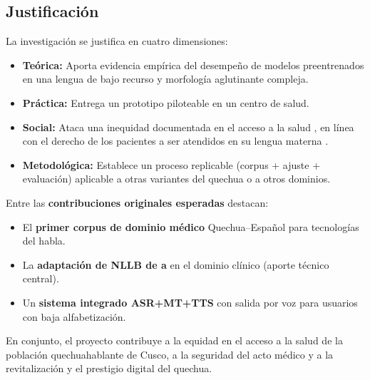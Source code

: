 \subsection{Justificaci{\'o}n}
\noindent La investigaci{\'o}n se justifica en cuatro dimensiones:
\begin{itemize}\setlength{\itemsep}{1pt}
  \item \textbf{Te{\'o}rica:} Aporta evidencia emp{\'i}rica del desempe{\~n}o de modelos
  preentrenados  en una lengua
  de bajo recurso y morfolog{\'i}a aglutinante compleja.
  \item \textbf{Pr{\'a}ctica:} Entrega un prototipo piloteable en un centro de salud.
  \item \textbf{Social:} Ataca una inequidad documentada en el acceso a la salud
  \parencite{begazo2026}, en l{\'i}nea con el derecho de los pacientes a ser atendidos en su
  lengua materna \parencite{essalud2023}.
  \item \textbf{Metodol{\'o}gica:} Establece un proceso replicable (corpus + ajuste + evaluaci{\'o}n)
  aplicable a otras variantes del quechua o a otros dominios.
\end{itemize}
\noindent Entre las \textbf{contribuciones originales esperadas} destacan:
\begin{itemize}\setlength{\itemsep}{1pt}
  \item El \textbf{primer corpus de dominio m{\'e}dico} Quechua--Espa{\~n}ol para tecnolog{\'i}as del habla.
  \item La \textbf{adaptaci{\'o}n de NLLB de  a } en el dominio cl{\'i}nico
  (aporte t{\'e}cnico central).
  \item Un \textbf{sistema integrado ASR+MT+TTS} con salida por voz para usuarios con baja alfabetizaci{\'o}n.
\end{itemize}
\noindent En conjunto, el proyecto contribuye a la equidad en el acceso a la salud de la
poblaci{\'o}n quechuahablante de Cusco, a la seguridad del acto m{\'e}dico y a la revitalizaci{\'o}n
y el prestigio digital del quechua.

